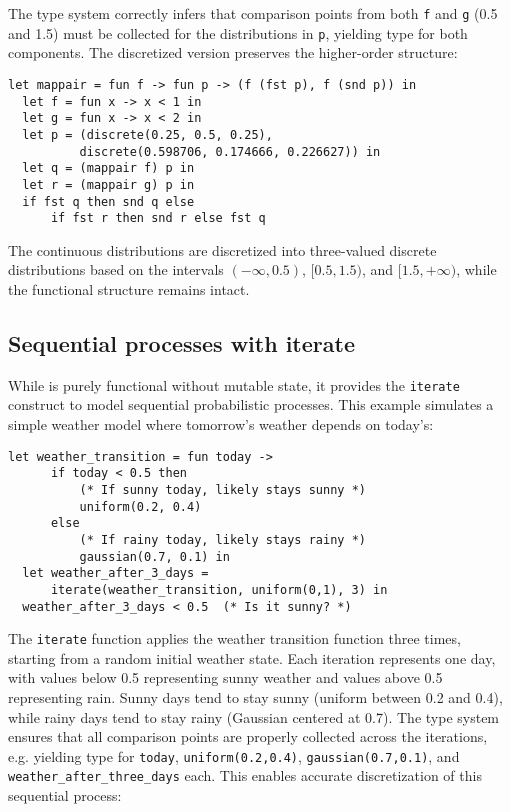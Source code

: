 \noindent The type system correctly infers that comparison points from both \texttt{f} and \texttt{g} (0.5 and 1.5) must be collected for the distributions in \texttt{p}, yielding type  for both components. The discretized version preserves the higher-order structure:

\begin{lstlisting}[aboveskip=1em,belowskip=1em]
  let mappair = fun f -> fun p -> (f (fst p), f (snd p)) in
  let f = fun x -> x < 1 in
  let g = fun x -> x < 2 in
  let p = (discrete(0.25, 0.5, 0.25), 
          discrete(0.598706, 0.174666, 0.226627)) in
  let q = (mappair f) p in
  let r = (mappair g) p in
  if fst q then snd q else 
      if fst r then snd r else fst q
\end{lstlisting}

\noindent The continuous distributions are discretized into three-valued discrete distributions based on the intervals $(-\infty, 0.5)$, $[0.5, 1.5)$, and $[1.5, +\infty)$, while the functional structure remains intact.

\subsection{Sequential processes with iterate}

While \Slice{} is purely functional without mutable state, it provides the \texttt{iterate} construct to model sequential probabilistic processes. This example simulates a simple weather model where tomorrow's weather depends on today's:

\begin{lstlisting}[aboveskip=1em,belowskip=1em,escapechar=!]
  let weather_transition = fun today ->
      if today < 0.5 then 
          (* If sunny today, likely stays sunny *)
          uniform(0.2, 0.4)
      else  
          (* If rainy today, likely stays rainy *)
          gaussian(0.7, 0.1) in
  let weather_after_3_days = 
      iterate(weather_transition, uniform(0,1), 3) in
  weather_after_3_days < 0.5  (* Is it sunny? *)
\end{lstlisting}

\noindent The \texttt{iterate} function applies the weather transition function three times, starting from a random initial weather state. Each iteration represents one day, with values below 0.5 representing sunny weather and values above 0.5 representing rain. Sunny days tend to stay sunny (uniform between 0.2 and 0.4), while rainy days tend to stay rainy (Gaussian centered at 0.7). The type system ensures that all comparison points are properly collected across the iterations, e.g. yielding type  for \texttt{today}, \texttt{uniform(0.2,0.4)}, \texttt{gaussian(0.7,0.1)}, and \texttt{weather\_after\_three\_days} each. This enables accurate discretization of this sequential process:

